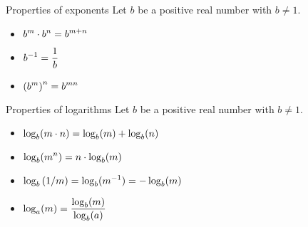 \documentclass[10pt,t,presentation,ignorenonframetext,aspectratio=169]{beamer}
\begin{document}
\begin{frame}
  \vs
  \begin{block}{Properties of exponents}
    Let $b$ be a positive real number with $b\ne 1$.
    \begin{itemize}
    \item $\displaystyle b^m\cdot b^n = b^{m+n}$
    \item $\displaystyle b^{-1} = \frac{1}{b}$
    \item $\displaystyle \left(b^m\right)^n = b^{mn}$
    \end{itemize}
  \end{block}
  \vfill
  \begin{block}{Properties of logarithms}
    Let $b$ be a positive real number with $b\ne 1$.
    \begin{itemize}
    \item $\displaystyle \log_b(m\cdot n) = \log_b(m) + \log_b(n)$
    \item $\displaystyle \log_b(m^n) = n\cdot \log_b(m)$
    \item $\displaystyle \log_b\left(1/m\right) = \log_b(m^{-1}) = -\log_b(m)$
    \item $\displaystyle \log_a(m) = \frac{\log_b(m)}{\log_b(a)}$
    \end{itemize}
  \end{block}
  \vfill
\end{frame}
\end{document}
